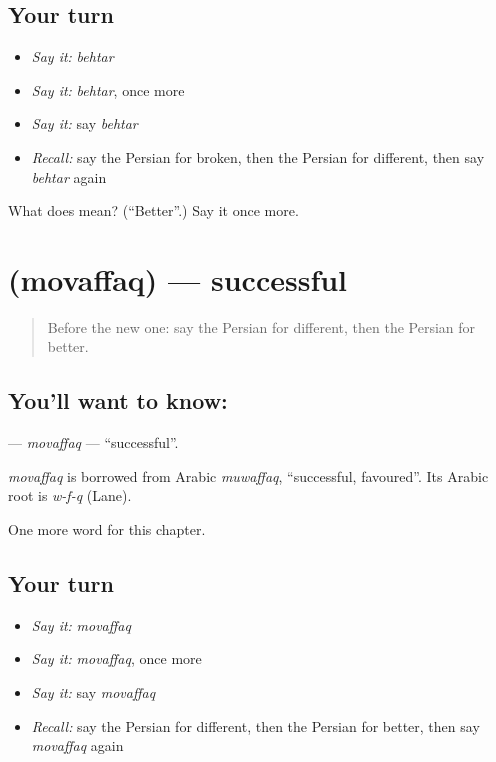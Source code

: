 \subsection*{Your turn}
\begin{itemize}
\raggedright
  \item \emph{Say it:} \emph{behtar}
  \item \emph{Say it:} \emph{behtar}, once more
  \item \emph{Say it:} say \emph{behtar}
  \item \emph{Recall:} say the Persian for broken, then the Persian for different, then say \emph{behtar} again
\end{itemize}

\begin{tcolorbox}[breakable,colback=teal!4,colframe=teal!35!black,title={Before you move on}]
What does  mean? (\textquotedblleft{}Better\textquotedblright{}.) Say it once more.
\end{tcolorbox}
\section[\texorpdfstring{\fa{موفق} (movaffaq)}{موفق (movaffaq)}]{ (movaffaq) — successful}

\label{lesson:FA-C164-movaffaq}



\begin{quote}
Before the new one: say the Persian for different, then the Persian for better.
\end{quote}

\subsection*{You'll want to know: }
\textbf{} — \emph{movaffaq} — \textquotedblleft{}successful\textquotedblright{}.

\begin{cousinweb}
\emph{movaffaq} is borrowed from Arabic \emph{muwaffaq}, \textquotedblleft{}successful, favoured\textquotedblright{}. Its Arabic root is \emph{w-f-q} (Lane).
\end{cousinweb}

\begin{grammarlens}[title={What you've built}]
One more word for this chapter.
\end{grammarlens}

\subsection*{Your turn}
\begin{itemize}
\raggedright
  \item \emph{Say it:} \emph{movaffaq}
  \item \emph{Say it:} \emph{movaffaq}, once more
  \item \emph{Say it:} say \emph{movaffaq}
  \item \emph{Recall:} say the Persian for different, then the Persian for better, then say \emph{movaffaq} again
\end{itemize}

